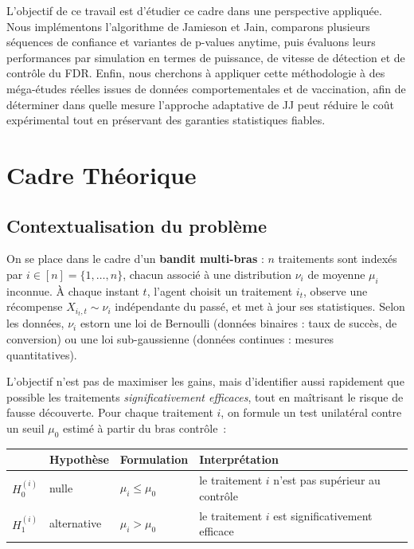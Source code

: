 \documentclass[10.5pt,a4paper]{article}
\begin{document}
L'objectif de ce travail est d'étudier ce cadre dans une perspective
appliquée. Nous implémentons l'algorithme de Jamieson et Jain, comparons
plusieurs séquences de confiance et variantes de p-values anytime, puis
évaluons leurs performances par simulation en termes de puissance, de
vitesse de détection et de contrôle du FDR. Enfin, nous cherchons à appliquer
cette méthodologie à des méga-études réelles issues de données
comportementales et de vaccination, afin de déterminer dans quelle mesure
l'approche adaptative de JJ peut réduire le coût expérimental tout en
préservant des garanties statistiques fiables.


\section{Cadre Th\'eorique}
\label{sec:cadre}

\subsection{Contextualisation du probl\`eme}

On se place dans le cadre d'un \textbf{bandit multi-bras} : $n$ traitements
sont index\'es par $i \in [n] = \{1,\ldots,n\}$, chacun
associ\'e \`a une distribution $\nu_i$ de moyenne $\mu_i$ inconnue.
\`A chaque instant $t$, l'agent choisit un traitement $i_t$, observe une
r\'ecompense $X_{i_t,t} \sim \nu_i$ ind\'ependante du pass\'e, et met \`a
jour ses statistiques. Selon les donn\'ees, $\nu_i$ estorn une loi de
Bernoulli (donn\'ees binaires : taux de succ\`es, de conversion) ou une
loi sub-gaussienne (donn\'ees continues : mesures quantitatives).

L'objectif n'est pas de maximiser les gains, mais d'identifier aussi
rapidement que possible les traitements \emph{significativement efficaces},
tout en ma\^itrisant le risque de fausse d\'ecouverte. Pour chaque
traitement $i$, on formule un test unilat\'eral contre un seuil $\mu_0$
estim\'e \`a partir du bras contr\^ole~:

\vspace{0.5em}
\begin{center}
\renewcommand{\arraystretch}{1.6}
\begin{tabular}{@{}llll@{}}
\toprule
 & \textbf{Hypoth\`ese} & \textbf{Formulation} & \textbf{Interpr\'etation} \\
\midrule
$H_0^{(i)}$ & nulle      & $\mu_i \leq \mu_0$ & le traitement $i$ n'est pas sup\'erieur au contr\^ole \\
$H_1^{(i)}$ & alternative & $\mu_i > \mu_0$   & le traitement $i$ est significativement efficace \\
\bottomrule
\end{tabular}
\end{center}
\vspace{0.3em}
\end{document}
